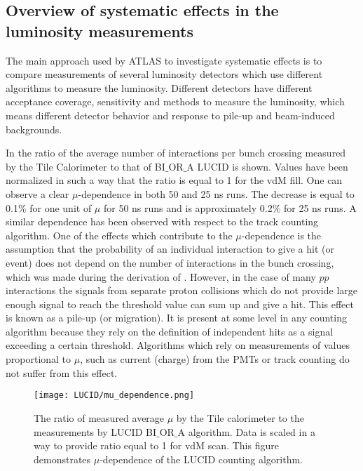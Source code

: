 \subsection{Overview of systematic effects in the luminosity measurements}

The main approach used by ATLAS to investigate systematic effects is to compare measurements of several luminosity detectors which use different algorithms to measure the luminosity.
Different detectors have different acceptance coverage, sensitivity and methods to measure the luminosity, 
which means different detector behavior and response to pile-up and beam-induced backgrounds.

In  the ratio of the average number of \pp interactions per bunch crossing measured by the Tile Calorimeter to that of BI$\_$OR$\_$A LUCID is shown.
Values have been normalized in such a way that the ratio is equal to 1 for the vdM fill.
One can observe a clear $\mu$-dependence in both 50 and 25 ns runs. 
The decrease is equal to 0.1$\%$ for one unit of $\mu$ for 50 ns runs and is approximately 0.2$\%$ for 25 ns runs.
A similar dependence has been observed with respect to the track counting algorithm.
One of the effects which contribute to the $\mu$-dependence is the assumption that the probability of an individual \pp interaction to give a hit (or event) does not depend on the number of interactions in the bunch crossing, which was made during the derivation of .
However, in the case of many $pp$ interactions the signals from separate proton collisions which do not provide large enough signal to reach the threshold value can sum up and give a hit. 
This effect is known as a pile-up (or migration).
It is present at some level in any counting algorithm because they rely on the definition of independent hits as a signal exceeding a certain threshold.
Algorithms which rely on measurements of values proportional to $\mu$, such as current (charge) from the PMTs or track counting do not suffer from this effect.



\begin{figure}
\centering
\texttt{[image: LUCID/mu\_dependence.png]}
\caption{The ratio of measured average $\mu$ by the Tile calorimeter to the measurements by LUCID BI$\_$OR$\_$A algorithm. Data is scaled in a way to provide ratio equal to 1 for vdM scan.
This figure demonstrates $\mu$-dependence of the LUCID counting algorithm.}
\label{fig:mu_dependence}
\end{figure}

